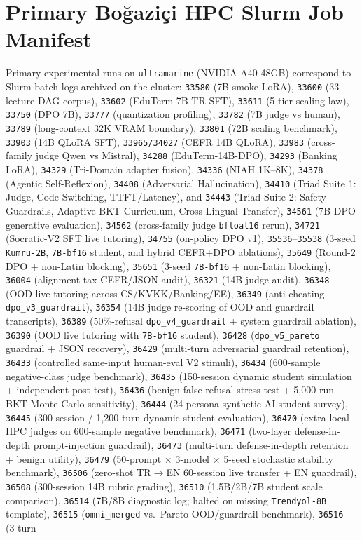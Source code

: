 \documentclass[a4paper,12pt]{report}
\begin{document}
\section{Primary Bo\u{g}azi\c{c}i HPC Slurm Job Manifest}
Primary experimental runs on \texttt{ultramarine} (NVIDIA A40 48GB) correspond to Slurm batch logs archived on the cluster: \texttt{33580} (7B smoke LoRA), \texttt{33600} (33-lecture DAG corpus), \texttt{33602} (EduTerm-7B-TR SFT), \texttt{33611} (5-tier scaling law), \texttt{33750} (DPO 7B), \texttt{33777} (quantization profiling), \texttt{33782} (7B judge vs human), \texttt{33789} (long-context 32K VRAM boundary), \texttt{33801} (72B scaling benchmark), \texttt{33903} (14B QLoRA SFT), \texttt{33965/34027} (CEFR 14B QLoRA), \texttt{33983} (cross-family judge Qwen vs Mistral), \texttt{34288} (EduTerm-14B-DPO), \texttt{34293} (Banking LoRA), \texttt{34329} (Tri-Domain adapter fusion), \texttt{34336} (NIAH 1K--8K), \texttt{34378} (Agentic Self-Reflexion), \texttt{34408} (Adversarial Hallucination), \texttt{34410} (Triad Suite 1: Judge, Code-Switching, TTFT/Latency), and \texttt{34443} (Triad Suite 2: Safety Guardrails, Adaptive BKT Curriculum, Cross-Lingual Transfer), \texttt{34561} (7B DPO generative evaluation), \texttt{34562} (cross-family judge \texttt{bfloat16} rerun), \texttt{34721} (Socratic-V2 SFT live tutoring), \texttt{34755} (on-policy DPO v1), \texttt{35536}--\texttt{35538} (3-seed \texttt{Kumru-2B}, \texttt{7B-bf16} student, and hybrid CEFR+DPO ablations), \texttt{35649} (Round-2 DPO + non-Latin blocking), \texttt{35651} (3-seed \texttt{7B-bf16} + non-Latin blocking), \texttt{36004} (alignment tax CEFR/JSON audit), \texttt{36321} (14B judge audit), \texttt{36348} (OOD live tutoring across CS/KVKK/Banking/EE), \texttt{36349} (anti-cheating \texttt{dpo\_v3\_guardrail}), \texttt{36354} (14B judge re-scoring of OOD and guardrail transcripts), \texttt{36389} (50\%-refusal \texttt{dpo\_v4\_guardrail} + system guardrail ablation), \texttt{36390} (OOD live tutoring with \texttt{7B-bf16} student), \texttt{36428} (\texttt{dpo\_v5\_pareto} guardrail + JSON recovery), \texttt{36429} (multi-turn adversarial guardrail retention), \texttt{36433} (controlled same-input human-eval V2 stimuli), \texttt{36434} (600-sample negative-class judge benchmark), \texttt{36435} (150-session dynamic student simulation + independent post-test), \texttt{36436} (benign false-refusal stress test + 5,000-run BKT Monte Carlo sensitivity), \texttt{36444} (24-persona synthetic AI student survey), \texttt{36445} (300-session / 1,200-turn dynamic student evaluation), \texttt{36470} (extra local HPC judges on 600-sample negative benchmark), \texttt{36471} (two-layer defense-in-depth prompt-injection guardrail), \texttt{36473} (multi-turn defense-in-depth retention + benign utility), \texttt{36479} (50-prompt $\times$ 3-model $\times$ 5-seed stochastic stability benchmark), \texttt{36506} (zero-shot TR$\to$EN 60-session live transfer + EN guardrail), \texttt{36508} (300-session 14B rubric grading), \texttt{36510} (1.5B/2B/7B student scale comparison), \texttt{36514} (7B/8B diagnostic log; halted on missing \texttt{Trendyol-8B} template), \texttt{36515} (\texttt{omni\_merged} vs.\ Pareto OOD/guardrail benchmark), \texttt{36516} (3-turn 
\end{document}
